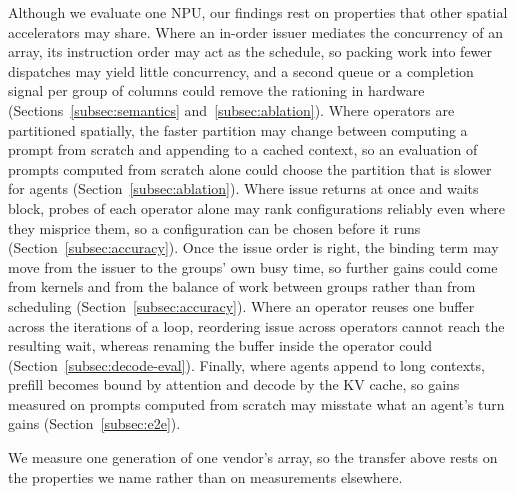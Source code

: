 Although we evaluate one NPU, our findings rest on properties that other spatial accelerators may share.
Where an in-order issuer mediates the concurrency of an array, its instruction order may act as the schedule, so packing work into fewer dispatches may yield little concurrency, and a second queue or a completion signal per group of columns could remove the rationing in hardware (Sections~\ref{subsec:semantics} and~\ref{subsec:ablation}).
Where operators are partitioned spatially, the faster partition may change between computing a prompt from scratch and appending to a cached context, so an evaluation of prompts computed from scratch alone could choose the partition that is slower for agents (Section~\ref{subsec:ablation}).
Where issue returns at once and waits block, probes of each operator alone may rank configurations reliably even where they misprice them, so a configuration can be chosen before it runs (Section~\ref{subsec:accuracy}).
Once the issue order is right, the binding term may move from the issuer to the groups' own busy time, so further gains could come from kernels and from the balance of work between groups rather than from scheduling (Section~\ref{subsec:accuracy}).
Where an operator reuses one buffer across the iterations of a loop, reordering issue across operators cannot reach the resulting wait, whereas renaming the buffer inside the operator could (Section~\ref{subsec:decode-eval}).
Finally, where agents append to long contexts, prefill becomes bound by attention and decode by the KV cache, so gains measured on prompts computed from scratch may misstate what an agent's turn gains (Section~\ref{subsec:e2e}).

We measure one generation of one vendor's array, so the transfer above rests on the properties we name rather than on measurements elsewhere.

